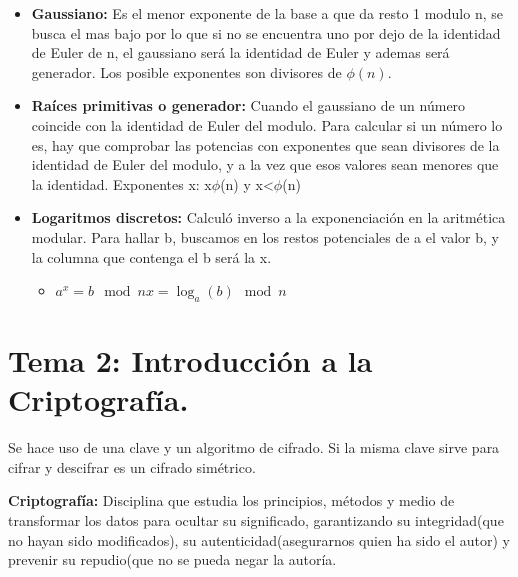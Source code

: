 \documentclass[12pt, twoside, openright]{report} %
\begin{document}
\begin{itemize}
  \item \textbf{Gaussiano:} Es el menor exponente de la base a que da resto
    1 modulo n, se busca el mas bajo por lo que si no se encuentra uno
    por dejo de la identidad de Euler de n, el gaussiano será la
    identidad de Euler y ademas será generador. Los posible exponentes
    son divisores de $\phi(n)$.
    
  \item \textbf{Raíces primitivas o generador:} Cuando el gaussiano de un
    número coincide con la identidad de Euler del modulo. Para calcular
    si un número lo es, hay que comprobar las potencias con exponentes
    que sean divisores de la identidad de Euler del modulo, y a la vez
    que esos valores sean menores que la identidad. Exponentes x:
    x\textbar $\phi$(n) y x\textless $\phi$(n)
    
  \item \textbf{Logaritmos discretos:} Calculó inverso a la exponenciación
    en la aritmética modular. Para hallar b, buscamos en los restos
    potenciales de a el valor b, y la columna que contenga el b será la
    x.
    

    \begin{itemize}
    \item
      
	  $a^x = b \mod n x=\log_a(b) \mod n$
      
    \end{itemize}
  \end{itemize}

  
\chapter{Tema 2: Introducción a la Criptografía.}

  Se hace uso de una clave y un algoritmo de cifrado. Si la misma clave
  sirve para cifrar y descifrar es un cifrado simétrico.
  
  \textbf{Criptografía:} Disciplina que estudia los principios, métodos
  y medio de transformar los datos para ocultar su significado,
  garantizando su integridad(que no hayan sido modificados), su
  autenticidad(asegurarnos quien ha sido el autor) y prevenir su
  repudio(que no se pueda negar la autoría.
  
\end{document}
